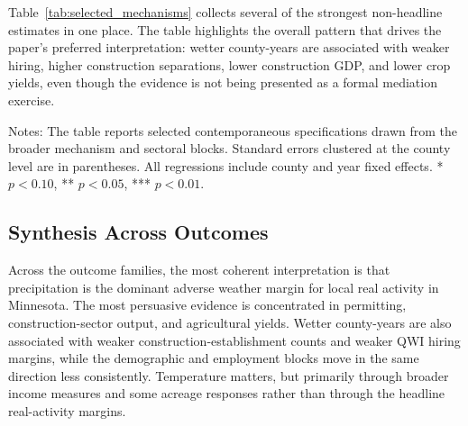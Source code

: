 \documentclass[12pt]{article}
\begin{document}
Table~\ref{tab:selected_mechanisms} collects several of the strongest non-headline estimates in one place. The table highlights the overall pattern that drives the paper's preferred interpretation: wetter county-years are associated with weaker hiring, higher construction separations, lower construction GDP, and lower crop yields, even though the evidence is not being presented as a formal mediation exercise.

\begin{table}[htbp]
\centering
\caption{Selected Mechanism-Consistent Estimates}
\label{tab:selected_mechanisms}
{\footnotesize
{}

\medskip
\parbox{0.96\textwidth}{\footnotesize Notes: The table reports selected contemporaneous specifications drawn from the broader mechanism and sectoral blocks. Standard errors clustered at the county level are in parentheses. All regressions include county and year fixed effects. * $p<0.10$, ** $p<0.05$, *** $p<0.01$.}
}
\end{table}

\subsection{Synthesis Across Outcomes}

Across the outcome families, the most coherent interpretation is that precipitation is the dominant adverse weather margin for local real activity in Minnesota. The most persuasive evidence is concentrated in permitting, construction-sector output, and agricultural yields. Wetter county-years are also associated with weaker construction-establishment counts and weaker QWI hiring margins, while the demographic and employment blocks move in the same direction less consistently. Temperature matters, but primarily through broader income measures and some acreage responses rather than through the headline real-activity margins.
\end{document}
